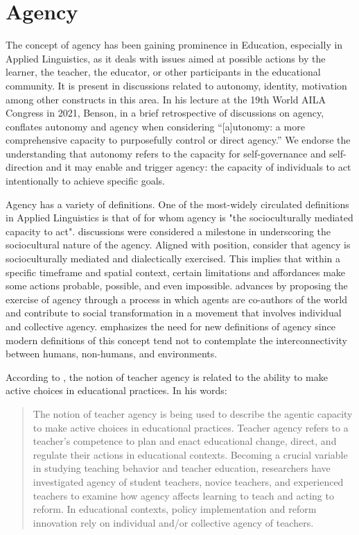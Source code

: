 \section{Agency}\label{sec-agency}

The concept of agency has been gaining prominence in Education, especially in Applied Linguistics, as it deals with issues aimed at possible actions by the learner, the teacher, the educator, or other participants in the educational community. It is present in discussions related to autonomy, identity, motivation among other constructs in this area. In his lecture at the 19th World AILA Congress in 2021, Benson, in a brief retrospective of discussions on agency, conflates autonomy and agency when considering “[a]utonomy: a more comprehensive capacity to purposefully control or direct agency.” We endorse the understanding that autonomy refers to the capacity for self-governance and self-direction and it may enable and trigger agency: the capacity of individuals to act intentionally to achieve specific goals.


Agency has a variety of definitions. One of the most-widely circulated definitions in Applied Linguistics is that of \textcite[p. 112]{ahearn2001} for whom agency is "the socioculturally mediated capacity to act".   discussions were considered a milestone in underscoring the sociocultural nature of the agency. Aligned with  position, \textcite{lantolf2006} consider that agency is socioculturally mediated and dialectically exercised. This implies that within a specific timeframe and spatial context, certain limitations and affordances make some actions probable, possible, and even impossible. \textcite{stetsenko2020} advances by proposing the exercise of agency through a process in which agents are co-authors of the world and contribute to social transformation in a movement that involves individual and collective agency. \textcite{picard2010} emphasizes the need for new definitions of agency since modern definitions of this concept tend not to contemplate the interconnectivity between humans, non-humans, and environments.


According to \textcite[p. 1]{sang2020}, the notion of teacher agency is related to the ability to make active choices in educational practices. In his words:

\begin{quote}
    The notion of teacher agency is being used to describe the agentic capacity to make active choices in educational practices. Teacher agency refers to a teacher's competence to plan and enact educational change, direct, and regulate their actions in educational contexts. Becoming a crucial variable in studying teaching behavior and teacher education, researchers have investigated agency of student teachers, novice teachers, and experienced teachers to examine how agency affects learning to teach and acting to reform. In educational contexts, policy implementation and reform innovation rely on individual and/or collective agency of teachers.
\end{quote}

